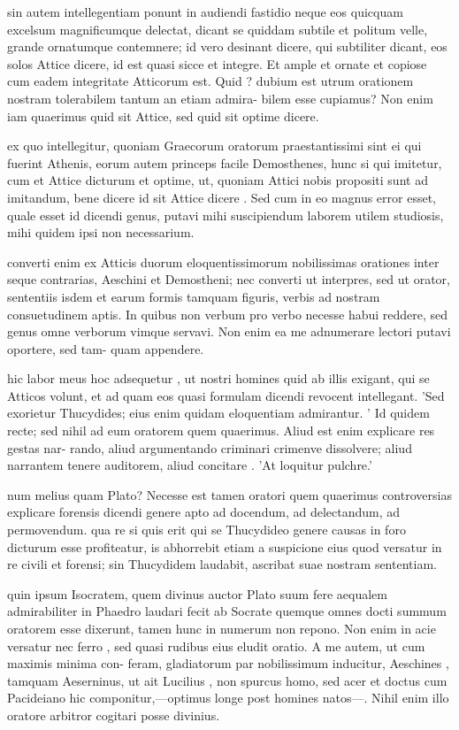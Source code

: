  sin autem intellegentiam ponunt in audiendi fastidio neque eos quicquam excelsum magnificumque delectat, dicant se quiddam subtile et politum velle, grande ornatumque contemnere; id vero desinant dicere, qui subtiliter dicant, eos solos Attice dicere, id est quasi sicce et integre. Et ample et ornate et copiose cum eadem integritate Atticorum est. Quid ? dubium est utrum orationem nostram tolerabilem tantum an etiam admira- bilem esse cupiamus? Non enim iam quaerimus quid sit Attice, sed quid sit optime dicere.

 ex quo intellegitur, quoniam Graecorum oratorum praestantissimi sint ei qui fuerint Athenis, eorum autem princeps facile Demosthenes, hunc si qui imitetur, cum et Attice dicturum et optime, ut, quoniam Attici nobis propositi sunt ad imitandum, bene dicere id sit Attice dicere . Sed cum in eo magnus error esset, quale esset id dicendi genus, putavi mihi suscipiendum laborem utilem studiosis, mihi quidem ipsi non necessarium.

 converti enim ex Atticis duorum eloquentissimorum nobilissimas orationes inter seque contrarias, Aeschini et Demostheni; nec converti ut interpres, sed ut orator, sententiis isdem et earum formis tamquam figuris, verbis ad nostram consuetudinem aptis. In quibus non verbum pro verbo necesse habui reddere, sed genus omne verborum vimque servavi. Non enim ea me adnumerare lectori putavi oportere, sed tam- quam appendere.

 hic labor meus hoc adsequetur , ut nostri homines quid ab illis exigant, qui se Atticos volunt, et ad quam eos quasi formulam dicendi revocent intellegant. 'Sed exorietur Thucydides; eius enim quidam eloquentiam admirantur. ' Id quidem recte; sed nihil ad eum oratorem quem quaerimus. Aliud est enim explicare res gestas nar- rando, aliud argumentando criminari crimenve dissolvere; aliud narrantem tenere auditorem, aliud concitare . 'At loquitur pulchre.'

 num melius quam Plato? Necesse est tamen oratori quem quaerimus controversias explicare forensis dicendi genere apto ad docendum, ad delectandum, ad permovendum. qua re si quis erit qui se Thucydideo genere causas in foro dicturum esse profiteatur, is abhorrebit etiam a suspicione eius quod versatur in re civili et forensi; sin Thucydidem laudabit, ascribat suae nostram sententiam.

 quin ipsum Isocratem, quem divinus auctor Plato suum fere aequalem admirabiliter in Phaedro laudari fecit ab Socrate quemque omnes docti summum oratorem esse dixerunt, tamen hunc in numerum non repono. Non enim in acie versatur nec ferro , sed quasi rudibus eius eludit oratio. A me autem, ut cum maximis minima con- feram, gladiatorum par nobilissimum inducitur, Aeschines , tamquam Aeserninus, ut ait Lucilius , non spurcus homo, sed acer et doctus cum Pacideiano hic componitur,—optimus longe post homines natos—. Nihil enim illo oratore arbitror cogitari posse divinius.

